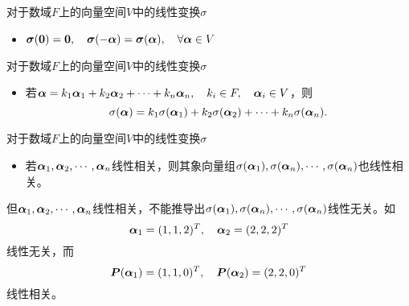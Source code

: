 \begin{frame} 
  对于数域$F$上的向量空间$V$中的线性变换$\sigma$
  
  \begin{itemize}
  \item $\sigmabd(\M0)=\M0, \quad \sigmabd(-\alphabd)=\sigmabd(\alphabd), \quad \forall\alphabd\in V$
  \end{itemize}
\end{frame}

\begin{frame} 
    对于数域$F$上的向量空间$V$中的线性变换$\sigma$

  \begin{itemize}
  \item 若$\boldsymbol{\alpha}=k_1\boldsymbol{\alpha}_1+k_2\boldsymbol{\alpha}_2+\cdots+k_n\boldsymbol{\alpha}_n, \quad k_i\in F, \quad \boldsymbol{\alpha}_i\in V$，则
    $$
    \sigma(\boldsymbol{\alpha})=k_1\sigma(\boldsymbol{\alpha}_1)+k_2\sigma(\boldsymbol{\alpha}_2)+\cdots+k_n\sigma(\boldsymbol{\alpha}_n).
    $$
  \end{itemize}
\end{frame}

\begin{frame} 
    对于数域$F$上的向量空间$V$中的线性变换$\sigma$

  \begin{itemize}
  \item 若$\boldsymbol{\alpha}_1, \boldsymbol{\alpha}_2, \cdots, \boldsymbol{\alpha}_n$线性相关，则其象向量组$\sigma(\boldsymbol{\alpha}_1),\sigma(\boldsymbol{\alpha}_n),\cdots,\sigma(\boldsymbol{\alpha}_n)$也线性相关。
  \end{itemize}

  \vspace{.1in}
  \pause 

  \begin{zhu}
    但$\boldsymbol{\alpha}_1, \boldsymbol{\alpha}_2, \cdots, \boldsymbol{\alpha}_n$线性相关，不能推导出$\sigma(\boldsymbol{\alpha}_1),\sigma(\boldsymbol{\alpha}_n),\cdots,\sigma(\boldsymbol{\alpha}_n)$线性无关。如
    $$
    \boldsymbol{\alpha}_1=(1,1,2)^T, \quad \boldsymbol{\alpha}_2=(2,2,2)^T
    $$
    线性无关，而
    $$
    \boldsymbol{P}(\boldsymbol{\alpha}_1)=(1,1,0)^T, \quad \boldsymbol{P}(\boldsymbol{\alpha}_2)=(2,2,0)^T
    $$
    线性相关。
  \end{zhu}
\end{frame}
